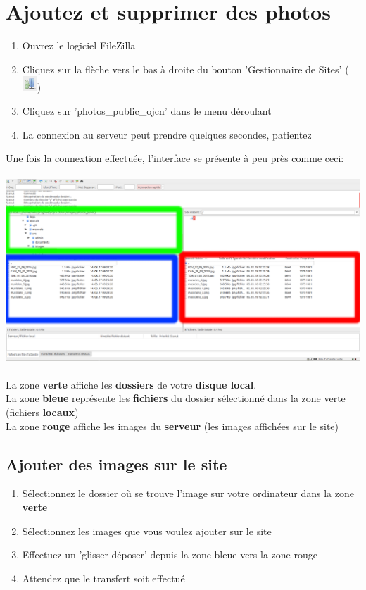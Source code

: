 \documentclass[10pt,a4paper]{article}
\begin{document}
\section{Ajoutez et supprimer des photos}
\begin{enumerate}
\item Ouvrez le logiciel FileZilla
\item Cliquez sur la flèche vers le bas à droite du bouton 'Gestionnaire de Sites' (\includegraphics[scale=1]{images/gestionnaire_de_sites.png})
\item Cliquez sur 'photos\_public\_ojcn' dans le menu déroulant
\item La connexion au serveur peut prendre quelques secondes, patientez
\end{enumerate}
\newpage

Une fois la connextion effectuée, l'interface se présente à peu près comme ceci: \\ 
\\
\includegraphics[scale=.2]{images/connected_modif.png} \\
\\
La zone \textbf{verte} affiche les \textbf{dossiers} de votre \textbf{disque local}.\\
La zone \textbf{bleue} représente les \textbf{fichiers} du dossier sélectionné dans la zone verte (fichiers \textbf{locaux}) \\
La zone \textbf{rouge} affiche les images du \textbf{serveur} (les images affichées sur le site) \\

\subsection{Ajouter des images sur le site}
\begin{enumerate}
\item Sélectionnez le dossier où se trouve l'image sur votre ordinateur dans la zone \textbf{verte}
\item Sélectionnez les images que vous voulez ajouter sur le site
\item Effectuez un 'glisser-déposer' depuis la zone bleue vers la zone rouge
\item Attendez que le transfert soit effectué
\end{enumerate}
\end{document}
